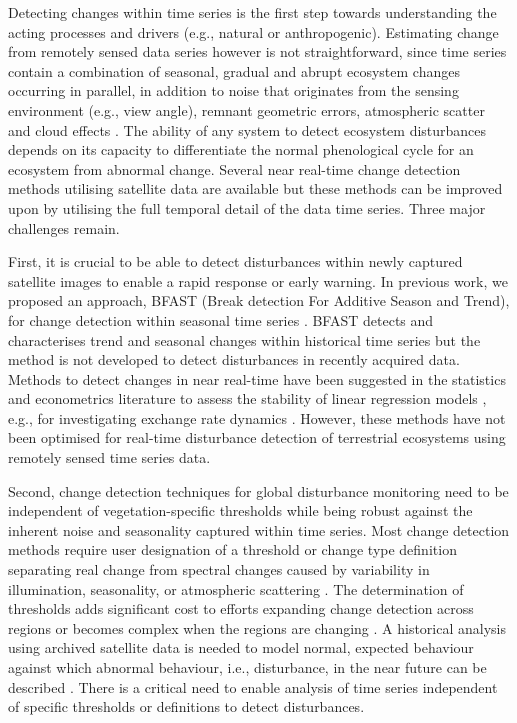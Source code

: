 \documentclass[authoryear,preprint,review,10pt]{elsarticle}
\begin{document}
Detecting changes within time series is the first step towards understanding the acting processes and drivers (e.g., natural or anthropogenic). Estimating
change from remotely sensed data series however is not straightforward, since time series contain a combination of seasonal, gradual and abrupt ecosystem
changes occurring in parallel, in addition to noise that originates from the sensing environment (e.g., view angle), remnant geometric errors, atmospheric
scatter and cloud effects \citep{Beurs2005a, Roy2002, Wolfe1998}. The ability of any system to detect ecosystem disturbances depends on its capacity to
differentiate the normal phenological cycle for an ecosystem from abnormal change. Several near real-time change detection methods utilising satellite data
are available \citep{Jiang:2010ko, Verdin:2005by, White2006} but these methods can be improved upon by utilising the full temporal detail of the data time
series. Three major challenges remain.

First, it is crucial to be able to detect disturbances within newly captured satellite images to enable a rapid response or early warning. In previous work, we proposed an approach,  BFAST (Break detection For Additive Season and Trend), for change detection within seasonal time series \citep{deJong:wo, Verbesselt2009a,Verbesselt:2010wo}.
BFAST detects and characterises trend and seasonal changes within historical time series but the method is not developed to detect disturbances in recently acquired data. Methods to detect changes in near real-time have been suggested in the statistics and econometrics literature to assess the stability of linear regression models \citep{Chu1996}, e.g., for investigating exchange rate dynamics \citep{Zeileis:2010tt}. However, these methods have not been optimised for real-time disturbance detection of terrestrial ecosystems using remotely sensed time series data.

Second, change detection techniques for global disturbance monitoring need to be independent of vegetation-specific thresholds while being robust against the inherent noise and seasonality captured within time series.
Most change detection methods require user designation of a threshold or change type definition separating real change from spectral changes caused by variability in illumination, seasonality, or atmospheric scattering \citep{Lu2004, Potter2003, Hayes2007}. The determination of thresholds adds significant cost to efforts expanding change detection across regions or becomes complex when the regions are changing  \citep{White2006}. A historical analysis using archived satellite data is needed to model normal, expected behaviour against which abnormal behaviour, i.e., disturbance, in the near future can be described \citep{Hargrove2009}. There is a critical need to enable analysis of time series independent of specific thresholds or definitions to detect disturbances.
\end{document}
